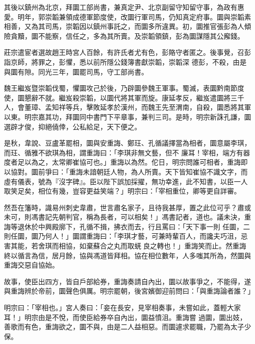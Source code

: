 \begin{pinyinscope}
 其後以鎮州為北京，拜圜工部尚書，兼真定尹、北京副留守知留守事，為政有惠愛。明年，郭崇韜兼領成德軍節度使，改圜行軍司馬，仍知真定府事。圜與崇韜素相善，又為其司馬，崇韜因以鎮州事託之，而圜多所違異。初，圜推官張彭為人傾險貪黷，圜不能察，信任之，多為其所賣。及崇韜領鎮，彭為圜謀隱其公廨錢。



 莊宗遣宦者選故趙王時宮人百餘，有許氏者尤有色，彭賂守者匿之。後事覺，召彭詣京師，將罪之，彭懼，悉以前所隱公錢簿書獻崇韜，崇韜深
 德彭，不殺，由是與圜有隙。同光三年，圜罷司馬，守工部尚書。



 魏王繼岌暨崇韜伐蜀，懼圜攻己於後，乃辟圜參魏王軍事。蜀滅，表圜黔南節度使，圜懇辭不就。繼岌殺崇韜，以圜代將其軍而旋。康延孝反，繼岌遣圜將三千人，會董璋、孟知祥等兵，擊敗延孝於漢州，而魏王先至渭南，自殺，圜悉將其軍以東。明宗嘉其功，拜圜同中書門下平章事，兼判三司。是時，明宗新誅孔謙，圜選辟才俊，抑絕僥倖，公私給足，天下便之。



 是秋，韋說、豆盧革罷相，圜與安重誨、鄭玨、孔循議擇當為相者，圜意屬李琪，而玨、循雅不欲琪為相，謂重誨曰：「李琪非無文藝，但不
 廉耳！宰相，端方有器度者足以為之，太常卿崔協可也。」重誨以為然。佗日，明宗問誰可相者，重誨即以協對。圜前爭曰：「重誨未諳朝廷人物，為人所賣。天下皆知崔協不識文字，而虛有儀表，號為『沒字碑』。臣以陛下誤加採擢，無功幸進，此不知書，以臣一人取笑足矣，相位有幾，豈容更益笑端？」明宗曰：「宰相重位，卿等更自詳審。



 然吾在籓時，識易州刺史韋肅，世言肅名家子，且待我甚厚，置之此位可乎？肅或未可，則馮書記先朝判官，稱為長者，可以相矣！」馮書記者，道也。議未決，重誨等退休於中興殿廓下，孔循不揖，拂衣而去，行且罵曰：「天下事一則
 任圜，二則任圜，圜乃何人！」圜謂重誨曰：「李琪才藝，可兼時輩百人，而讒夫巧沮，忌害其能，若舍琪而相協，如棄蘇合之丸而取蜣良之轉也！」重誨笑而止。然重誨終以循言為信，居月餘，協與馮道皆拜相。協在相位數年，人多嗤其所為，然圜與重誨交惡自協始。



 故事，使臣出四方，皆自戶部給券，重誨奏請自內出，圜以故事爭之，不能得，遂與重誨辨於帝前，圜聲色俱厲。明宗罷朝，後宮嬪御迎前問曰：「與重誨論者誰？」



 明宗曰：「宰相也。」宮人奏曰：「妾在長安，見宰相奏事，未嘗如此，蓋輕大家耳！」明宗由是不悅，而使臣給券卒自內出，圜益憤沮。重誨嘗
 過圜，圜出妓，善歌而有色，重誨欲之，圜不與，由是二人益相惡。而圜遽求罷職，乃罷為太子少保。




\end{pinyinscope}
